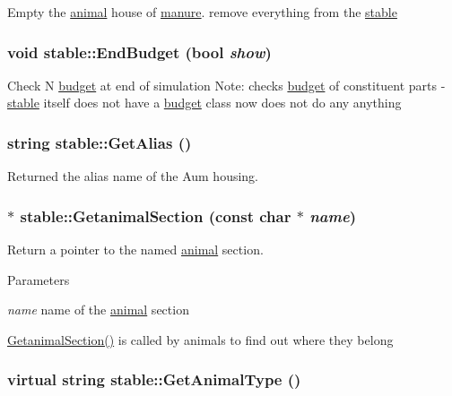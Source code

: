 Empty the \hyperlink{classanimal}{animal} house of \hyperlink{classmanure}{manure}. remove everything from the \hyperlink{classstable}{stable} \hypertarget{classstable_ab9f96c65f6dc2d3cf6b1788434505857}{
\subsubsection[{EndBudget}]{\setlength{\rightskip}{0pt plus 5cm}void stable::EndBudget (bool {\em show})}}
\label{classstable_ab9f96c65f6dc2d3cf6b1788434505857}
Check N \hyperlink{classbudget}{budget} at end of simulation Note: checks \hyperlink{classbudget}{budget} of constituent parts -\/ \hyperlink{classstable}{stable} itself does not have a \hyperlink{classbudget}{budget} class now does not do any anything \hypertarget{classstable_a26fb43b0d40106a87ba9ae11425ac9c6}{
\subsubsection[{GetAlias}]{\setlength{\rightskip}{0pt plus 5cm}string stable::GetAlias ()}}
\label{classstable_a26fb43b0d40106a87ba9ae11425ac9c6}


Returned the alias name of the Aum housing. \hypertarget{classstable_ad816f0c1199ebc697c10e8736e3faacc}{
\subsubsection[{GetanimalSection}]{ $\ast$ stable::GetanimalSection (const char $\ast$ {\em name})}}
\label{classstable_ad816f0c1199ebc697c10e8736e3faacc}


Return a pointer to the named \hyperlink{classanimal}{animal} section. 
\begin{DoxyParams}{Parameters}
\item[{\em name}]name of the \hyperlink{classanimal}{animal} section\end{DoxyParams}
\hyperlink{classstable_ad816f0c1199ebc697c10e8736e3faacc}{GetanimalSection()} is called by animals to find out where they belong \hypertarget{classstable_af11653ccffcdc3bfb928d47485fc39b4}{
\subsubsection[{GetAnimalType}]{\setlength{\rightskip}{0pt plus 5cm}virtual string stable::GetAnimalType ()}}
\label{classstable_af11653ccffcdc3bfb928d47485fc39b4}


